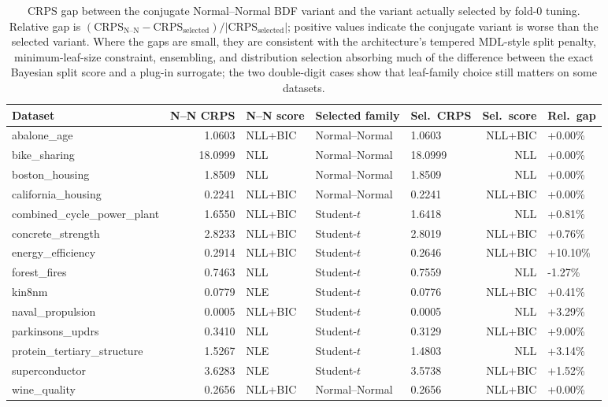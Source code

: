 \begin{table}[htbp]
\centering
\caption{CRPS gap between the conjugate Normal--Normal BDF variant and the variant actually selected by fold-0 tuning. Relative gap is $(\mathrm{CRPS}_{\text{N--N}} - \mathrm{CRPS}_{\text{selected}})/|\mathrm{CRPS}_{\text{selected}}|$; positive values indicate the conjugate variant is worse than the selected variant. Where the gaps are small, they are consistent with the architecture's tempered MDL-style split penalty, minimum-leaf-size constraint, ensembling, and distribution selection absorbing much of the difference between the exact Bayesian split score and a plug-in surrogate; the two double-digit cases show that leaf-family choice still matters on some datasets.}
\label{tab:bdf-conjugate-vs-selected-gap}
\begin{tabular}{lrlllrl}
\toprule
Dataset & N--N CRPS & N--N score & Selected family & Sel.\ CRPS & Sel.\ score & Rel.\ gap \\
\midrule
abalone\_age & 1.0603 & NLL+BIC & Normal--Normal & 1.0603 & NLL+BIC & +0.00\% \\
bike\_sharing & 18.0999 & NLL & Normal--Normal & 18.0999 & NLL & +0.00\% \\
boston\_housing & 1.8509 & NLL & Normal--Normal & 1.8509 & NLL & +0.00\% \\
california\_housing & 0.2241 & NLL+BIC & Normal--Normal & 0.2241 & NLL+BIC & +0.00\% \\
combined\_cycle\_power\_plant & 1.6550 & NLL+BIC & Student-$t$ & 1.6418 & NLL & +0.81\% \\
concrete\_strength & 2.8233 & NLL+BIC & Student-$t$ & 2.8019 & NLL+BIC & +0.76\% \\
energy\_efficiency & 0.2914 & NLL+BIC & Student-$t$ & 0.2646 & NLL+BIC & +10.10\% \\
forest\_fires & 0.7463 & NLL & Student-$t$ & 0.7559 & NLL & -1.27\% \\
kin8nm & 0.0779 & NLE & Student-$t$ & 0.0776 & NLL+BIC & +0.41\% \\
naval\_propulsion & 0.0005 & NLL+BIC & Student-$t$ & 0.0005 & NLL & +3.29\% \\
parkinsons\_updrs & 0.3410 & NLL & Student-$t$ & 0.3129 & NLL+BIC & +9.00\% \\
protein\_tertiary\_structure & 1.5267 & NLE & Student-$t$ & 1.4803 & NLL & +3.14\% \\
superconductor & 3.6283 & NLE & Student-$t$ & 3.5738 & NLL+BIC & +1.52\% \\
wine\_quality & 0.2656 & NLL+BIC & Normal--Normal & 0.2656 & NLL+BIC & +0.00\% \\

\end{tabular}
\end{table}

